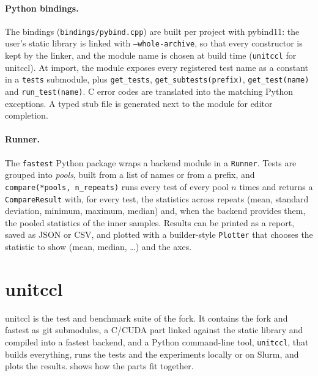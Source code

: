 \paragraph{Python bindings.}
The bindings (\texttt{bindings/pybind.cpp}) are built per project with pybind11: the user's static library is linked with \texttt{--whole-archive}, so that every constructor is kept by the linker, and the module name is chosen at build time (\texttt{unitccl} for unitccl).
At import, the module exposes every registered test name as a constant in a \texttt{tests} submodule, plus \texttt{get\_tests}, \texttt{get\_subtests(prefix)}, \texttt{get\_test(name)} and \texttt{run\_test(name)}. C error codes are translated into the matching Python exceptions.
A typed stub file is generated next to the module for editor completion.

\paragraph{Runner.}
The \texttt{fastest} Python package wraps a backend module in a \texttt{Runner}.
Tests are grouped into \emph{pools}, built from a list of names or from a prefix, and \texttt{compare(*pools, n\_repeats)} runs every test of every pool $n$ times and returns a \texttt{CompareResult} with, for every test, the statistics across repeats (mean, standard deviation, minimum, maximum, median) and, when the backend provides them, the pooled statistics of the inner samples.
Results can be printed as a report, saved as JSON or CSV, and plotted with a builder-style \texttt{Plotter} that chooses the statistic to show (mean, median, \dots) and the axes.

\section{unitccl}\label{sec:sw-unitccl}

unitccl is the test and benchmark suite of the \nccl{} fork.
It contains the fork and fastest as git submodules, a C/CUDA part linked against the static \nccl{} library and compiled into a fastest backend, and a Python command-line tool, \texttt{unitccl}, that builds everything, runs the tests and the experiments locally or on Slurm, and plots the results.
 shows how the parts fit together.


